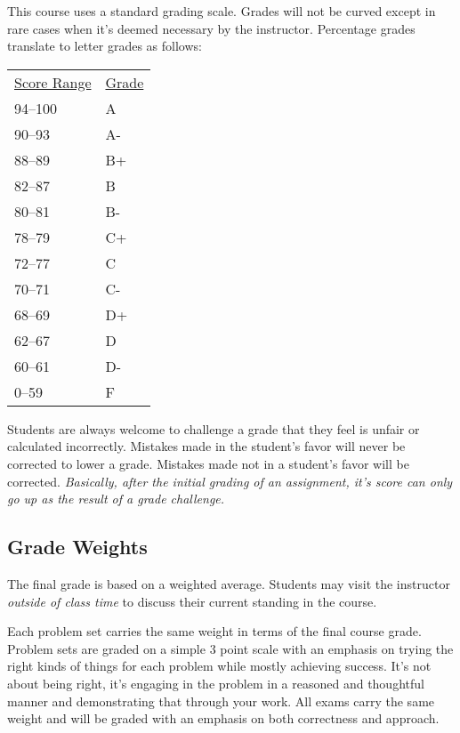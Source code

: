 \documentclass[nobib]{tufte-handout}
\begin{document}
This course uses a standard grading scale.  Grades will not be curved except in rare cases when it's deemed necessary by the instructor.  Percentage grades translate to letter grades as follows:
\newline
\begin{center}
\begin{small}
\begin{tabular}{ll}
\underline{Score Range} & \underline{Grade} \\
94--100 & A \\
90--93 & A- \\
88--89 & B+ \\
82--87 & B \\
80--81 & B- \\
78--79 & C+ \\
72--77 & C \\
70--71 & C- \\
68--69 & D+ \\
62--67 & D \\
60--61 & D- \\
0--59 & F
\end{tabular}
\end{small}
\end{center}


Students are always welcome to challenge a grade that they feel is unfair or calculated incorrectly.  Mistakes made in the student's favor will never be corrected to lower a grade.  Mistakes made not in a student's favor will be corrected.  \textit{Basically, after the initial grading of an assignment, it's score can only go up as the result of a grade challenge.}


\subsection{Grade Weights}

The final grade is based on a weighted average.  Students may visit the instructor \textit{outside of class time} to discuss their current standing in the course.

Each problem set carries the same weight in terms of the final course grade. Problem sets are graded on a simple 3 point scale with an emphasis on trying the right kinds of things for each problem while mostly achieving success. It's not about being right, it's engaging in the problem in a reasoned and thoughtful manner and demonstrating that through your work.  All exams carry the same weight and will be graded with an emphasis on both correctness and approach.
\end{document}
